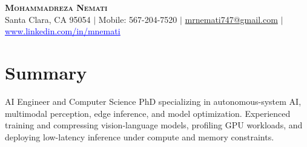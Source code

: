 \documentclass[letterpaper,13pt]{article}
\begin{document}
\begin{center}
    \textbf{\LARGE \scshape Mohammadreza Nemati} \\ \vspace{1pt}
    \small Santa Clara, CA 95054 $|$ Mobile: 567-204-7520 $|$
    \href{mailto:mrnemati747@gmail.com}{mrnemati747@gmail.com} $|$
    \href{https://www.linkedin.com/in/mnemati/}{\textcolor{blue}{\underline{www.linkedin.com/in/mnemati}}}
\end{center}

\section{Summary}
\small{AI Engineer and Computer Science PhD specializing in autonomous-system AI, multimodal perception, edge inference, and model optimization. Experienced training and compressing vision-language models, profiling GPU workloads, and deploying low-latency inference under compute and memory constraints.}
\vspace{0.05cm}
\end{document}
